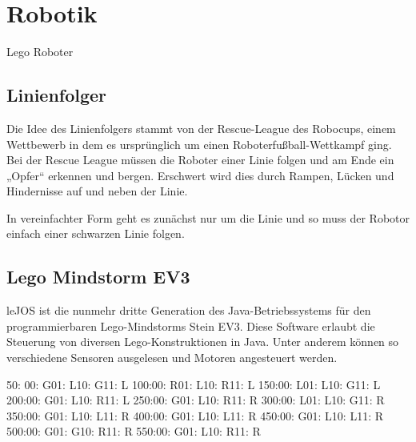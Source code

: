 \chapter{Robotik} %
\label{cha:robotik}

Lego Roboter

\section{Linienfolger} %
\label{sec:linienfolger}

Die Idee des Linienfolgers stammt von der Rescue-League des Robocups, einem Wettbewerb in dem es ursprünglich um einen Roboterfußball-Wettkampf ging. Bei der Rescue League müssen die Roboter einer Linie folgen und am Ende ein „Opfer“ erkennen und bergen. Erschwert wird dies durch Rampen, Lücken und Hindernisse auf und neben der Linie.

In vereinfachter Form geht es zunächst nur um die Linie und so muss der Robotor einfach einer schwarzen Linie folgen.


\section{Lego Mindstorm EV3} %
\label{sec:lego_mindstorm_ev3}

leJOS ist die nunmehr dritte Generation des Java-Betriebssystems für den programmierbaren Lego-Mindstorms Stein EV3. Diese Software erlaubt die Steuerung von diversen Lego-Konstruktionen in Java. Unter anderem können so verschiedene Sensoren ausgelesen und Motoren angesteuert werden.


50:
00: G01: L10: G11: L
100:00: R01: L10: R11: L
150:00: L01: L10: G11: L
200:00: G01: L10: R11: L
250:00: G01: L10: R11: R
300:00: L01: L10: G11: R
350:00: G01: L10: L11: R
400:00: G01: L10: L11: R
450:00: G01: L10: L11: R
500:00: G01: G10: R11: R
550:00: G01: L10: R11: R

